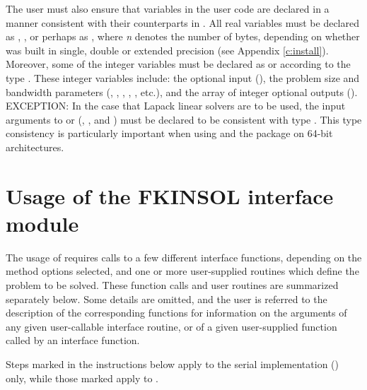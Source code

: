 The user must also ensure that variables in the user {\F} code are
declared in a manner consistent with their counterparts in {\kinsol}.
All real variables must be declared as , ,
or perhaps as , where {\em n} denotes the number of bytes,
depending on whether {\kinsol} was built in single, double or extended precision 
(see Appendix \ref{c:install}). Moreover, some of the {\F} integer variables
must be declared as  or  according to the 
{\C} type . These integer variables include:
the optional input (), the problem size and bandwidth parameters
(, , , , , etc.),
and the array of integer optional outputs ().
EXCEPTION: In the case that Lapack linear solvers are to be used, the
input arguments to  or  (,
, and ) must be declared to be consistent with {\C} type .
This type consistency is particularly important when using
{\kinsol} and the {\fkinsol} package on 64-bit architectures.

\section{Usage of the FKINSOL interface module}\label{ss:fkinsol_usage}

The usage of {\fkinsol} requires calls to a few different interface
functions, depending on the method options selected, and one or more
user-supplied routines which define the problem to be solved.  These
function calls and user routines are summarized separately below.
Some details are omitted, and the user is referred to the description
of the corresponding {\kinsol} functions for information on the arguments 
of any given user-callable interface routine, or of a given user-supplied 
function called by an interface function.

Steps marked  {\s} in the instructions below apply to the serial
{\nvector} implementation ({\nvecs}) only, while those marked {\p}
apply to {\nvecp}.

